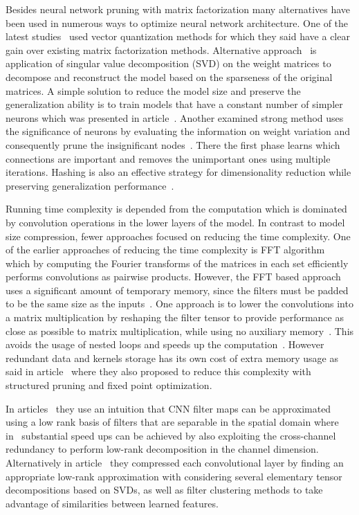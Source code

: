 \documentclass{article} %
\begin{document}
Besides neural network pruning with matrix factorization many alternatives have
been used in numerous ways to optimize neural network architecture. One of the
latest studies~\cite{DBLP:journals/corr/GongLYB14} used vector quantization
methods for which they said have a clear gain over existing matrix
factorization methods. Alternative approach~\cite{xue2013restructuring} is
application of singular value decomposition (SVD) on the weight matrices to
decompose and reconstruct the model based on the sparseness of the
original matrices. A simple solution to
reduce the model size and preserve the generalization ability is to train
models that have a constant number of simpler neurons which was presented in
article~\cite{collins2014memory}. Another examined strong method uses the 
significance of neurons by evaluating
the information on weight variation and consequently prune the insignificant
nodes~\cite{han2015learning}. There the first phase learns which 
connections are important and removes the unimportant ones using multiple 
iterations. Hashing is also an effective strategy for dimensionality reduction
while preserving generalization performance~\cite{weinberger2009feature,
shi2009hash, chen2015compressing}. 

Running time complexity is depended from the computation which is dominated by 
convolution operations in the lower layers of the model. In contrast to model 
size compression, fewer approaches focused on reducing the time complexity. One 
of the earlier approaches of reducing the 
time complexity is FFT algorithm~\cite{mathieu2013fast} which by computing the 
Fourier transforms of the matrices in each set efficiently performs 
convolutions as pairwise products. However, the FFT based approach uses a 
significant
amount of temporary memory, since the filters must be padded to be the same size 
as the 
inputs~\cite{chetlur2014cudnn}. One approach is to lower the convolutions into a 
matrix multiplication 
by reshaping the filter tensor to provide performance as close as possible to 
matrix 
multiplication, while using no auxiliary memory~\cite{chetlur2014cudnn}. This 
avoids the usage of nested loops and speeds up the 
computation~\cite{chellapilla2006high}. 
However redundant data and kernels storage has its own cost 
of extra memory usage as said in article~\cite{anwar2015structured} where they 
also proposed to 
reduce this complexity with structured pruning and fixed point optimization. 

In articles~\cite{jaderberg2014speeding, rigamonti2013learning} they use an
intuition that CNN filter maps can be approximated using a low rank basis of
filters that are separable in the spatial domain where 
in~\cite{jaderberg2014speeding}
substantial speed ups can be achieved by also exploiting the cross-channel 
redundancy to perform low-rank decomposition in the
channel dimension. 
Alternatively in article~\cite{denton2014exploiting} they compressed each 
convolutional layer by finding an appropriate low-rank approximation with 
considering several elementary tensor decompositions based on SVDs, 
as well as filter clustering methods to take advantage of 
similarities between learned features.
\end{document}
